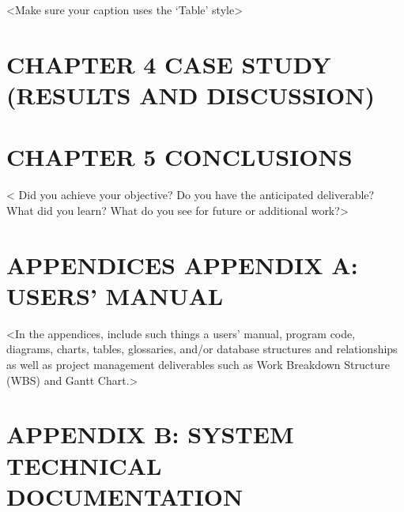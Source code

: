 \documentclass[12pt,openany]{book}
\begin{document}
{\textless}Make sure your caption uses the ‘Table’ style{\textgreater}

\chapter[CASE STUDY (RESULTS AND DISCUSSION)]{\hfill CHAPTER 4 \hfill\null\vskip15pt CASE STUDY (RESULTS AND DISCUSSION)}

\chapter[CONCLUSIONS]{\hfill CHAPTER 5 \hfill\null\vskip15pt CONCLUSIONS}

{\textless} Did you achieve your objective? Do you have the anticipated deliverable? What did you learn? What do you see for future or additional work?{\textgreater}

\clearpage
{}

\nocite{*}



\backmatter
\chapter[APPENDIX A: USERS’ MANUAL]{\hfill APPENDICES \hfill\null\newline\newline APPENDIX A: USERS’ MANUAL}

{\textless}In the appendices, include such things a users’ manual, program code, diagrams, charts, tables, glossaries, and/or database structures and relationships as well as project management deliverables such as Work Breakdown Structure (WBS) and Gantt Chart.{\textgreater}

\chapter{APPENDIX B: SYSTEM TECHNICAL DOCUMENTATION}
\end{document}
